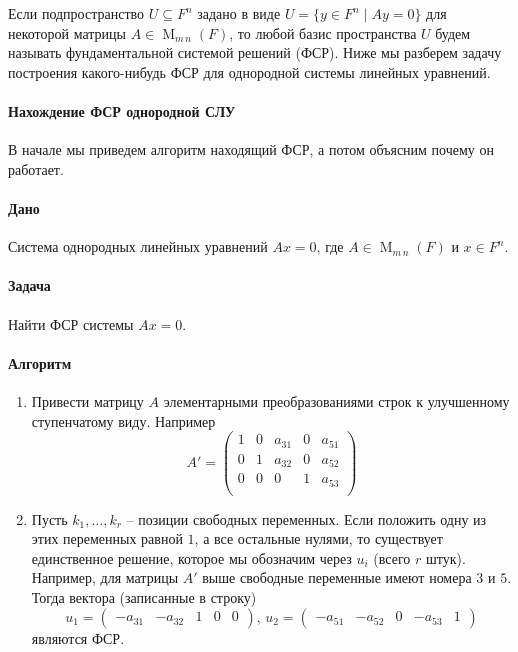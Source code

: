 Если подпространство $U\subseteq F^n$ задано в виде $U = \{y\in F^n\mid Ay = 0\}$ для некоторой матрицы $A\in\operatorname{M}_{m\,n}(F)$, то любой базис пространства $U$ будем называть фундаментальной системой решений (ФСР).
Ниже мы разберем задачу построения какого-нибудь ФСР для однородной системы линейных уравнений.

\paragraph{Нахождение ФСР однородной СЛУ}

В начале мы приведем алгоритм находящий ФСР, а потом объясним почему он работает.

\paragraph{Дано}

Система однородных линейных уравнений $Ax = 0$, где $A\in \operatorname{M}_{m\,n}(F)$ и $x\in F^n$.

\paragraph{Задача}

Найти ФСР системы $Ax = 0$.

\paragraph{Алгоритм}

\begin{enumerate}
\item Привести матрицу $A$ элементарными преобразованиями строк к улучшенному ступенчатому виду.
Например
\[
A' = 
\begin{pmatrix}
{1}&{0}&{a_{31}}&{0}&{a_{51}}\\
{0}&{1}&{a_{32}}&{0}&{a_{52}}\\
{0}&{0}&{0}&{1}&{a_{53}}\\
\end{pmatrix}
\]

\item Пусть $k_1,\ldots,k_r$ -- позиции свободных переменных.
Если положить одну из этих переменных равной $1$, а все остальные нулями, то существует единственное решение, которое мы обозначим через $u_i$ (всего $r$ штук).
Например, для матрицы $A'$ выше свободные переменные имеют номера $3$ и $5$.
Тогда вектора (записанные в строку)
\[
u_1 = 
\begin{pmatrix}
{-a_{31}}&{-a_{32}}&{1}&{0}&{0}
\end{pmatrix},\,
u_2 = 
\begin{pmatrix}
{-a_{51}}&{-a_{52}}&{0}&{-a_{53}}&{1}
\end{pmatrix}
\]
являются ФСР.
\end{enumerate}

